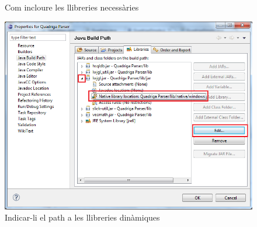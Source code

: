 \begin{figure}
  \centering
  \caption{Com incloure les llibreries necessàries}
  \label{fig:incloure}
\end{figure}

\begin{figure}
  \centering
  \includegraphics[width=0.58\linewidth]{./img/incloure3.png}
  \caption{Indicar-li el path a les llibreries dinàmiques \label{fig:incloure3}}
\end{figure}